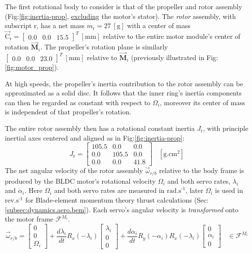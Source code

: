 \par
The first rotational body to consider is that of the propeller and rotor assembly (Fig:\ref{fig:inertia-prop}, \underline{excluding} the motor's stator). The \emph{rotor} assembly, with subscript r, has a net mass $m_{\text{r}}=27~[\text{g}]$ with a center of mass $\vec{\text{C}}_{\text{r}}=\begin{bmatrix}0.0&0.0&15.5\end{bmatrix}^T~[\text{mm}]$ relative to the entire motor module's center of rotation $\vec{\mathbf{M}}_i$. The propeller's rotation plane is similarly $\begin{bmatrix}0.0&0.0&23.0\end{bmatrix}^T~[\text{mm}]$ relative to $\vec{\mathbf{M}}_i$ (previously illustrated in Fig:\ref{fig:motor_prop}). 
\par
At high speeds, the propeller's inertia contribution to the rotor assembly can be approximated as a solid disc. It follows that the inner ring's inertia components can then be regarded as constant with respect to $\Omega_i$, moreover its center of mass is independent of that propeller's rotation. 
\par
The entire rotor assembly then has a rotational constant inertia $J_\text{r}$, with principle inertial axes centered and aligned as in Fig:\ref{fig:inertia-prop}:
\begin{equation}\label{eq:prop-inertia}
J_\text{r}=\begin{bmatrix}
105.5 & 0.0 & 0.0\\
0.0 & 105.5 & 0.0\\
0.0 & 0.0 & 41.8
\end{bmatrix}~~~~[\text{g.cm}^2]
\end{equation}
The net angular velocity of the rotor assembly $\vec{\omega}_{r/b}$ relative to the body frame is produced by the BLDC motor's rotational velocity $\Omega_i$ and both servo rates, $\dot{\lambda}_i$ and $\dot{\alpha}_i$. Here $\Omega_i$ and both servo rates are measured in $\text{rad.s}^{\text{-}1}$, later $\Omega_i$ is used in $\text{rev.s}^{\text{-}1}$ for Blade-element momentum theory thrust calculations (Sec:\ref{subsec:dynamics.aero.bem}). Each servo's angular velocity is \emph{transformed} onto the motor frame $\mathcal{F}^{M_i}$.
\begin{equation}\label{eq:net-angular-rot}
\vec{\omega}_{r/b}=\begin{bmatrix}
0\\
0\\
\Omega_i
\end{bmatrix}
+\frac{d\lambda_i}{dt}R_x(-\lambda_i)\begin{bmatrix}
\lambda_i\\
0\\
0
\end{bmatrix}+\frac{d\alpha_i}{dt}R_y(-\alpha_i)R_x(-\lambda_i)\begin{bmatrix}
0\\
\alpha_i\\
0
\end{bmatrix}~~~~\in\mathcal{F}^{M_i}
\end{equation}
